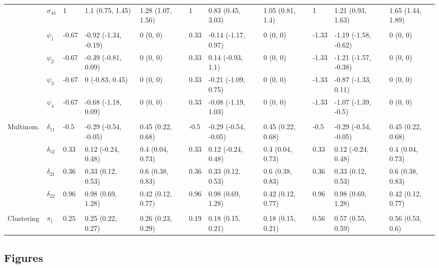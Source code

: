 \documentclass{article}
\begin{document}
\begin{landscape}
\begin{table}[t]
\begin{tabular}{lllllllllll}
\hspace{1em} & $\sigma_{44}$ & 1 & 1.1 (0.75, 1.45) & 1.28 (1.07, 1.56) & 1 & 0.83 (0.45, 3.03) & 1.05 (0.81, 1.4) & 1 & 1.21 (0.93, 1.63) & 1.65 (1.44, 1.89)\\
\addlinespace[0.3em]
\multicolumn{11}{l}{\textbf{ }}\\
\hspace{1em} & $\psi_{1}$ & -0.67 & -0.92 (-1.34, -0.19) & 0 (0, 0) & 0.33 & -0.14 (-1.17, 0.97) & 0 (0, 0) & -1.33 & -1.19 (-1.58, -0.62) & 0 (0, 0)\\
\hspace{1em} & $\psi_{2}$ & -0.67 & -0.39 (-0.81, 0.09) & 0 (0, 0) & 0.33 & 0.14 (-0.93, 1.1) & 0 (0, 0) & -1.33 & -1.21 (-1.57, -0.38) & 0 (0, 0)\\
\hspace{1em} & $\psi_{3}$ & -0.67 & 0 (-0.83, 0.45) & 0 (0, 0) & 0.33 & -0.21 (-1.09, 0.75) & 0 (0, 0) & -1.33 & -0.87 (-1.33, 0.11) & 0 (0, 0)\\
\hspace{1em} & $\psi_{4}$ & -0.67 & -0.68 (-1.18, 0.09) & 0 (0, 0) & 0.33 & -0.08 (-1.19, 1.03) & 0 (0, 0) & -1.33 & -1.07 (-1.39, -0.5) & 0 (0, 0)\\
\addlinespace[0.3em]
\multicolumn{11}{l}{\textbf{ }}\\
\hspace{1em}Multinom. & $\delta_{11}$ & -0.5 & -0.29 (-0.54, -0.05) & 0.45 (0.22, 0.68) & -0.5 & -0.29 (-0.54, -0.05) & 0.45 (0.22, 0.68) & -0.5 & -0.29 (-0.54, -0.05) & 0.45 (0.22, 0.68)\\
\hspace{1em} & $\delta_{12}$ & 0.33 & 0.12 (-0.24, 0.48) & 0.4 (0.04, 0.73) & 0.33 & 0.12 (-0.24, 0.48) & 0.4 (0.04, 0.73) & 0.33 & 0.12 (-0.24, 0.48) & 0.4 (0.04, 0.73)\\
\hspace{1em} & $\delta_{21}$ & 0.36 & 0.33 (0.12, 0.53) & 0.6 (0.38, 0.83) & 0.36 & 0.33 (0.12, 0.53) & 0.6 (0.38, 0.83) & 0.36 & 0.33 (0.12, 0.53) & 0.6 (0.38, 0.83)\\
\hspace{1em} & $\delta_{22}$ & 0.96 & 0.98 (0.69, 1.28) & 0.42 (0.12, 0.77) & 0.96 & 0.98 (0.69, 1.28) & 0.42 (0.12, 0.77) & 0.96 & 0.98 (0.69, 1.28) & 0.42 (0.12, 0.77)\\
\addlinespace[0.3em]
\multicolumn{11}{l}{\textbf{ }}\\
\hspace{1em}Clustering & $\pi_l$ & 0.25 & 0.25 (0.22, 0.27) & 0.26 (0.23, 0.29) & 0.19 & 0.18 (0.15, 0.21) & 0.18 (0.15, 0.21) & 0.56 & 0.57 (0.55, 0.59) & 0.56 (0.53, 0.6)\\
\bottomrule
\end{tabular}
\end{table}
\end{landscape}

\subsection{Figures}
\end{document}
